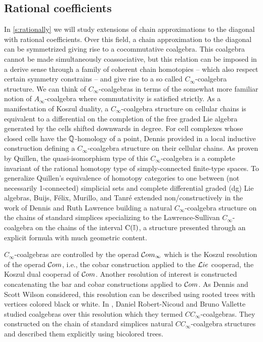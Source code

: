 \subsection*{Rational coefficients}

In \cref{s:rationally} we will study extensions of chain approximations to the diagonal with rational coefficients.
Over this field, a chain approximation to the diagonal can be symmetrized giving rise to a cocommutative coalgebra.
This coalgebra cannot be made simultaneously coassociative, but this relation can be imposed in a derive sense through a family of coherent chain homotopies -- which also respect certain symmetry constrains -- and give rise to a so called $C_\infty$-coalgebra structure.
We can think of $C_\infty$-coalgebras in terms of the somewhat more familiar notion of $A_\infty$-coalgebra where commutativity is satisfied strictly.
As a manifestation of Koszul duality, a $C_\infty$-coalgebra structure on cellular chains is equivalent to a differential on the completion of the free graded Lie algebra generated by the cells shifted downwards in degree.
For cell complexes whose closed cells have the $\mathbb{Q}$-homology of a point, Dennis provided in \cite{sullivan2007appendix} a local inductive construction defining a $C_\infty$-coalgebra structure on their cellular chains.
As proven by Quillen, the quasi-isomorphism type of this $C_\infty$-coalgebra is a complete invariant of the rational homotopy type of simply-connected finite-type spaces.
To generalize Quillen's equivalence of homotopy categories to one between (not necessarily 1-connected) simplicial sets and complete differential graded (dg) Lie algebras, Buijs, F{\'e}lix, Murillo, and Tanr{\'e} extended non\-/constructively in \cite{buijs2020liemodels} the work of Dennis and Ruth Lawrence \cite{lawrence2014interval} building a natural $C_\infty$-coalgebra structure on the chains of standard simplices specializing to the Lawrence-Sullivan $C_\infty$-coalgebra on the chains of the interval $\operatorname{C}(\mathbb{I})$, a structure presented through an explicit formula with much geometric content.

$C_\infty$-coalgebras are controlled by the operad $\mathcal{C}om_\infty$ which is the Koszul resolution of the operad $\mathcal{C}om$, i.e., the cobar construction applied to the $\mathcal{L}ie$ cooperad, the Koszul dual cooperad of $\mathcal{C}om$.
Another resolution of interest is constructed concatenating the bar and cobar constructions applied to $\mathcal{C}om$.
As Dennis and Scott Wilson considered, this resolution can be described using rooted trees with vertices colored black or white.
In \cite{vallette2020higherlietheory}, Daniel Robert-Nicoud and Bruno Vallette studied coalgebras over this resolution which they termed $CC_\infty$-coalgebras.
They constructed on the chain of standard simplices natural $CC_\infty$-coalgebra structures and described them explicitly using bicolored trees.

